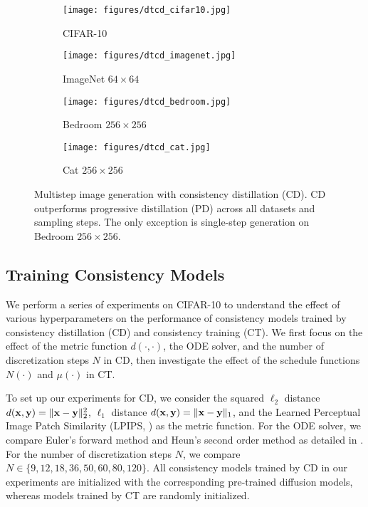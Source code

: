 \begin{figure*}
    \centering
    \begin{subfigure}[b]{0.25\textwidth}
        \texttt{[image: figures/dtcd\_cifar10.jpg]}
        \caption{CIFAR-10}
    \end{subfigure}%
    \begin{subfigure}[b]{0.25\textwidth}
        \texttt{[image: figures/dtcd\_imagenet.jpg]}
        \caption{ImageNet $64\times 64$}
    \end{subfigure}%
    \begin{subfigure}[b]{0.25\textwidth}
        \texttt{[image: figures/dtcd\_bedroom.jpg]}
        \caption{Bedroom $256\times 256$}
    \end{subfigure}%
    \begin{subfigure}[b]{0.25\textwidth}
        \texttt{[image: figures/dtcd\_cat.jpg]}
        \caption{Cat $256\times 256$}
    \end{subfigure}
    \caption{Multistep image generation with consistency distillation (CD). CD outperforms progressive distillation (PD) across all datasets and sampling steps. The only exception is single-step generation on Bedroom $256\times 256$.}
    \label{fig:iterative_sampling}
\end{figure*}


\subsection{Training Consistency Models}
We perform a series of experiments on CIFAR-10 to understand the effect of various hyperparameters on the performance of consistency models trained by consistency distillation (CD) and consistency training (CT). We first focus on the effect of the metric function $d(\cdot, \cdot)$, the ODE solver, and the number of discretization steps $N$ in CD, then investigate the effect of the schedule functions $N(\cdot)$ and $\mu(\cdot)$ in CT.

To set up our experiments for CD, we consider the squared $\ell_2$ distance $d({\mathbf{x}}, {\mathbf{y}}) = \|{\mathbf{x}} - {\mathbf{y}}\|^2_2$, $\ell_1$ distance $d({\mathbf{x}}, {\mathbf{y}}) = \|{\mathbf{x}}-{\mathbf{y}}\|_1$, and the Learned Perceptual Image Patch Similarity (LPIPS, \citet{zhang2018perceptual}) as the metric function. For the ODE solver, we compare Euler's forward method and Heun's second order method as detailed in \citet{karras2022edm}. For the number of discretization steps $N$, we compare $N \in \{9, 12, 18, 36, 50, 60, 80, 120\}$. All consistency models trained by CD in our experiments are initialized with the corresponding pre-trained diffusion models, whereas models trained by CT are randomly initialized.

